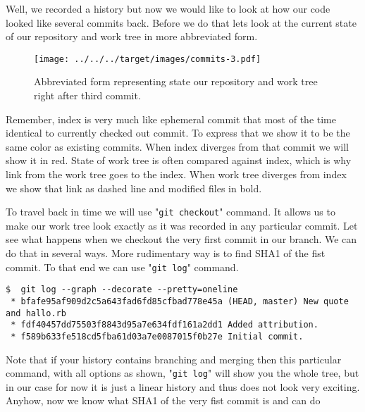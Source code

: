 \documentclass{article}
\theoremstyle{definition}
\begin{document}
        Well, we recorded a history but now we would like to look at how our code looked like several commits back.
        Before we do that lets look at the current state of our repository and work tree in more abbreviated form.

        \begin{figure}[h]
        \texttt{[image: ../../../target/images/commits-3.pdf]}
        \caption{Abbreviated form representing state our repository and work tree right after third commit.\label{fig:commits-3}}
        \end{figure}

        \noindent Remember, index is very much like ephemeral commit that most of the time identical to currently
        checked out commit. To express that we show it to be the same color as existing commits. When index
        diverges from that commit we will show it in red. State of work tree is often compared against index, which is
        why link from the work tree goes to the  index. When work tree diverges from index we show that link as dashed
        line and modified files in bold.

        To travel back in time we will use "\texttt{git checkout}" command. It allows us to make our work tree look
        exactly as it was recorded in any particular commit. Let see what happens when we checkout the very first
        commit in our branch. We can do that in several ways. More rudimentary way is to find SHA1 of the fist
        commit. To that end we can use "\texttt{git log}" command.

        \begin{Verbatim}[frame=single]
 $  git log --graph --decorate --pretty=oneline
 * bfafe95af909d2c5a643fad6fd85cfbad778e45a (HEAD, master) New quote and hallo.rb
 * fdf40457dd75503f8843d95a7e634fdf161a2dd1 Added attribution.
 * f589b633fe518cd5fba61d03a7e0087015f0b27e Initial commit.
        \end{Verbatim}
        Note that if your history contains branching and merging then this particular command, with all options as
        shown, "\texttt{git log}" will show you the whole tree, but in our case for now it is just a linear history
        and thus does not look very exciting. Anyhow, now we know what SHA1 of the very fist commit is and can do
\end{document}
